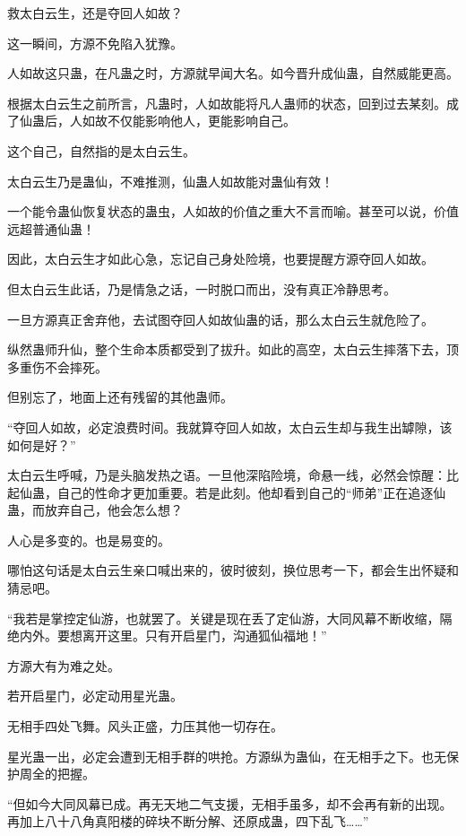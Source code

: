 
\begin{this_body}

救太白云生，还是夺回人如故？

这一瞬间，方源不免陷入犹豫。

人如故这只蛊，在凡蛊之时，方源就早闻大名。如今晋升成仙蛊，自然威能更高。

根据太白云生之前所言，凡蛊时，人如故能将凡人蛊师的状态，回到过去某刻。成了仙蛊后，人如故不仅能影响他人，更能影响自己。

这个自己，自然指的是太白云生。

太白云生乃是蛊仙，不难推测，仙蛊人如故能对蛊仙有效！

一个能令蛊仙恢复状态的蛊虫，人如故的价值之重大不言而喻。甚至可以说，价值远超普通仙蛊！

因此，太白云生才如此心急，忘记自己身处险境，也要提醒方源夺回人如故。

但太白云生此话，乃是情急之话，一时脱口而出，没有真正冷静思考。

一旦方源真正舍弃他，去试图夺回人如故仙蛊的话，那么太白云生就危险了。

纵然蛊师升仙，整个生命本质都受到了拔升。如此的高空，太白云生摔落下去，顶多重伤不会摔死。

但别忘了，地面上还有残留的其他蛊师。

“夺回人如故，必定浪费时间。我就算夺回人如故，太白云生却与我生出罅隙，该如何是好？”

太白云生呼喊，乃是头脑发热之语。一旦他深陷险境，命悬一线，必然会惊醒：比起仙蛊，自己的性命才更加重要。若是此刻。他却看到自己的“师弟”正在追逐仙蛊，而放弃自己，他会怎么想？

人心是多变的。也是易变的。

哪怕这句话是太白云生亲口喊出来的，彼时彼刻，换位思考一下，都会生出怀疑和猜忌吧。

“我若是掌控定仙游，也就罢了。关键是现在丢了定仙游，大同风幕不断收缩，隔绝内外。要想离开这里。只有开启星门，沟通狐仙福地！”

方源大有为难之处。

若开启星门，必定动用星光蛊。

无相手四处飞舞。风头正盛，力压其他一切存在。

星光蛊一出，必定会遭到无相手群的哄抢。方源纵为蛊仙，在无相手之下。也无保护周全的把握。

“但如今大同风幕已成。再无天地二气支援，无相手虽多，却不会再有新的出现。再加上八十八角真阳楼的碎块不断分解、还原成蛊，四下乱飞……”


\end{this_body}
